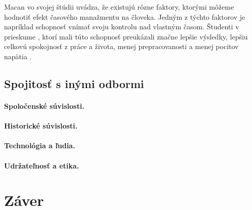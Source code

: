 \documentclass[10pt,slovak,a4paper]{article}
\begin{document}
		Macan \cite{Macan} vo svojej štúdii uvádza, že existujú rôzne faktory, ktorými môžeme hodnotiť efekt časového manažmentu na človeka. Jedným  z týchto faktorov je napríklad schopnosť vnímať svoju kontrolu nad vlastným časom. Študenti v prieskume \cite{Macan}, ktorí mali túto schopnosť preukázali značne lepšie výsledky, lepšiu celkovú spokojnosť z práce a života, menej prepracovanosti a menej pocitov napätia \cite{Macan}.
		
	\subsection{Spojitosť s inými odbormi}
		
		\paragraph{Spoločenské súvislosti.}
		
		\paragraph{Historické súvislosti.}
		\paragraph{Technológia a ľudia.}
		\paragraph{Udržateľnosť a etika.}
		
		
\section{Záver}



\end{document}
